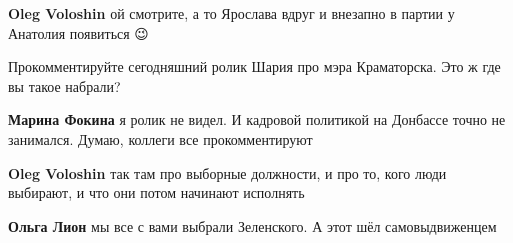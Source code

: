 \begin{itemize}
\begin{itemize}
 
\textbf{Oleg Voloshin} ой смотрите, а то Ярослава вдруг и внезапно в партии у Анатолия появиться 😉
\end{itemize}

 
Прокомментируйте сегодняшний ролик Шария про мэра Краматорска. Это ж где вы такое набрали?

\begin{itemize}
 
\textbf{Марина Фокина} я ролик не видел. И кадровой политикой на Донбассе точно не занимался. Думаю, коллеги все прокомментируют

 
\textbf{Oleg Voloshin} так там про выборные должности, и про то, кого люди выбирают, и что они потом начинают исполнять

 
\textbf{Ольга Лион} мы все с вами выбрали Зеленского. А этот шёл самовыдвиженцем

 

\end{itemize}
\end{itemize}
